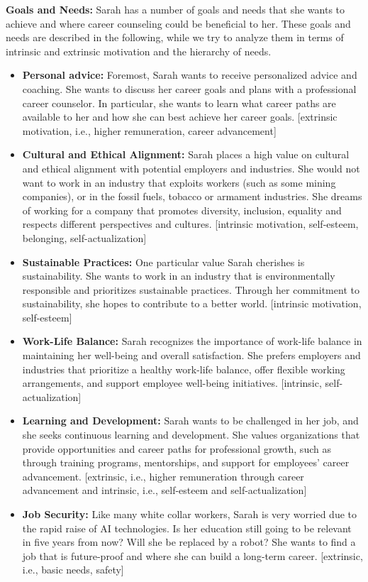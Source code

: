 \noindent\textbf{Goals and Needs:}
Sarah has a number of goals and needs that she wants to achieve and where career counseling could be beneficial to
her. These goals and needs are described in the following, while we try to analyze them in terms of intrinsic and
extrinsic motivation and the hierarchy of needs.

\begin{itemize}
    \item \textbf{Personal advice:}
        Foremost, Sarah wants to receive personalized advice and coaching. She wants to discuss her career goals and plans with a
        professional career counselor. In particular, she wants to learn what career paths are available to her and how she can best
        achieve her career goals. [extrinsic motivation, i.e., higher remuneration, career advancement]
    \item \textbf{Cultural and Ethical Alignment:}
        Sarah places a high value on cultural and ethical alignment with potential employers and industries. She would not want to work 
        in an industry that exploits workers (such as some mining companies), or in the fossil fuels, tobacco or armament industries. She
        dreams of working for a company that promotes diversity, inclusion, equality and respects different perspectives and cultures.
        [intrinsic motivation, self-esteem, belonging, self-actualization]
    \item \textbf{Sustainable Practices:} 
        One particular value Sarah cherishes is sustainability. She wants to work in an industry that is environmentally responsible and
        prioritizes sustainable practices. Through her commitment to sustainability, she hopes to contribute to a better world. [intrinsic
        motivation, self-esteem]
        \item \textbf{Work-Life Balance:}
        Sarah recognizes the importance of work-life balance in maintaining her well-being and overall satisfaction. She prefers
        employers and industries that prioritize a healthy work-life balance, offer flexible working arrangements, and support
        employee well-being initiatives. [intrinsic, self-actualization]
    \item \textbf{Learning and Development:}
        Sarah wants to be challenged in her job, and she seeks continuous learning and development. She values organizations that provide
        opportunities and career paths for professional growth, such as through training programs, mentorships, and support for employees'
        career advancement. [extrinsic, i.e., higher remuneration through career advancement and intrinsic, i.e., self-esteem and self-actualization]
    \item \textbf{Job Security:}
        Like many white collar workers, Sarah is very worried due to the rapid raise of AI technologies. Is her education still going to
        be relevant in five years from now? Will she be replaced by a robot? She wants to find a job that is future-proof and where she
        can build a long-term career. [extrinsic, i.e., basic needs, safety]
\end{itemize}

